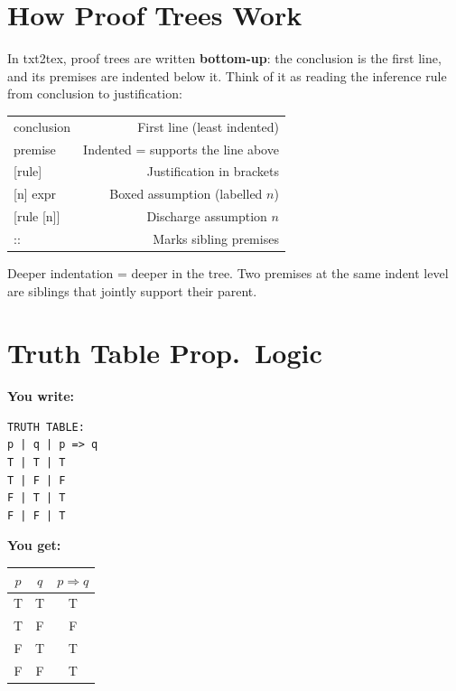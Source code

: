 \documentclass[10pt,landscape,a4paper]{article}
\newenvironment{exwrite}%
  {\par\noindent\scriptsize\textbf{You write:}\par\vspace{0pt}\scriptsize}%
  {\vspace{1pt}}
\newenvironment{exget}%
  {\par\noindent\scriptsize\textbf{You get:}\par\vspace{0pt}\small}%
  {\par\vspace{3pt}}
\begin{document}
\begin{multicols}{3}
\raggedcolumns

\section{How Proof Trees Work}

{\scriptsize
In txt2tex, proof trees are written \textbf{bottom-up}: the conclusion is the first line, and its premises are indented below it. Think of it as reading the inference rule from conclusion to justification:

\smallskip
\begin{tabularx}{\columnwidth}{LR}
\textrm{conclusion}  & First line (least indented) \\
\textrm{\quad premise}& Indented = supports the line above \\
{[rule]}              & Justification in brackets \\
{[n] expr}            & Boxed assumption (labelled $n$) \\
{[rule {[n]}]}        & Discharge assumption $n$ \\
::                    & Marks sibling premises \\
\end{tabularx}

\smallskip
Deeper indentation = deeper in the tree. Two premises at the same indent level are siblings that jointly support their parent.
}


\section{Truth Table {\normalsize\color{gray}\textrm{\scriptsize Prop.\ Logic}}}

\begin{exwrite}%
\begin{verbatim}
TRUTH TABLE:
p | q | p => q
T | T | T
T | F | F
F | T | T
F | F | T
\end{verbatim}
\end{exwrite}
\begin{exget}%
\begin{center}
\begin{tabular}{ccc}
$p$ & $q$ & $p \Rightarrow q$ \\ \hline
T & T & T \\
T & F & F \\
F & T & T \\
F & F & T \\
\end{tabular}
\end{center}
\end{exget}


\end{multicols}
\end{document}
